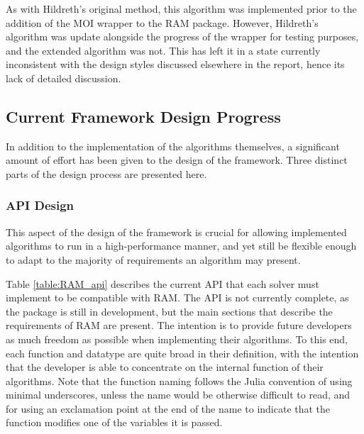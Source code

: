 As with Hildreth's original method, this algorithm was implemented prior to the addition of the MOI wrapper to the RAM package. However, Hildreth's algorithm was update alongside the progress of the wrapper for testing purposes, and the extended algorithm was not. This has left it in a state currently inconsistent with the design styles discussed elsewhere in the report, hence its lack of detailed discussion.

\subsection{Current Framework Design Progress}\label{sub_framework_prog}
In addition to the implementation of the algorithms themselves, a significant amount of effort has been given to the design of the framework. Three distinct parts of the design process are presented here. 

\subsubsection{API Design}
This aspect of the design of the framework is crucial for allowing implemented algorithms to run in a high-performance manner, and yet still be flexible enough to adapt to the majority of requirements an algorithm may present.

Table \ref{table:RAM_api} describes the current API that each solver must implement to be compatible with RAM. The API is not currently complete, as the package is still in development, but the main sections that describe the requirements of RAM are present. The intention is to provide future developers as much freedom as possible when implementing their algorithms. To this end, each function and datatype are quite broad in their definition, with the intention that the developer is able to concentrate on the internal function of their algorithms. Note that the function naming follows the Julia convention of using minimal underscores, unless the name would be otherwise difficult to read, and for using an exclamation point at the end of the name to indicate that the function modifies one of the variables it is passed.

